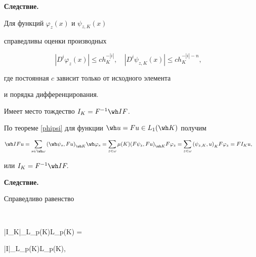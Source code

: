 {\bf Следствие.}




Для функций $\varphi_z(x)$ и $\psi_{z,K}(x)$ 


справедливы оценки производных 


$$


|D^i \varphi_z(x)| \le c h_K^{-|i|},


\quad |D^i \psi_{z,K}(x)| \le c h_K^{-|i|-n},


$$


где постоянная $c$ зависит только от исходного элемента 


и порядка дифференцирования. 







\begin{thm} \label{FIF}


Имеет место тождество $I_K=F^{-1} \wh I F$.


\end{thm}





\begin{pf}


По теореме \ref{phipsi} для функции $\wh u=Fu \in L_1(\wh K)$ получим 


$$


\wh I Fu = \sum_{s \in \wh \omega} {(\wh \psi_s,Fu)}_{\wh K} \wh \varphi_s


= \sum \limits_{z \in \omega} \mu(K){(F \psi_z,F u)}_{\wh K} F \varphi_z


= \sum \limits_{z \in \omega} {(\psi_{z,K},u)}_K F \varphi_z = FI_Ku,


$$


или $I_K=F^{-1}\wh I F.$


\end{pf}





{\bf Следствие.}




Справедливо равенство 


$$


{|I_K|}_{L_p(K)\rightarrow L_p(K)} =


{|\wh I|}_{L_p(\wh K)\rightarrow L_p(\wh K)},


